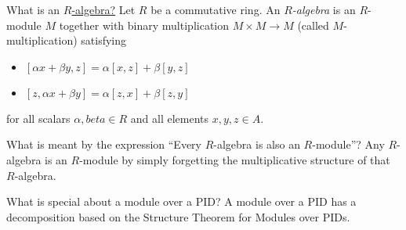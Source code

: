 \documentclass[avery5371,grid]{flashcards}
\begin{document}
\begin{flashcard}[Modules]{What is an \underline{$R$-algebra?}}
 Let $R$ be a commutative ring. An \emph{$R$-algebra} is an $R$-module $M$ together with binary multiplication $M \times M \to M$ (called $M$-multiplication) satisfying
 \begin{itemize}
      \item $[\alpha x + \beta y, z] = \alpha[x,z] + \beta[y,z]$
      \item $[z, \alpha x + \beta y] = \alpha[z,x] + \beta[z,y]$
 \end{itemize}
for all scalars $\alpha, beta \in R$ and all elements $x,y,z \in A$.
\end{flashcard}


\begin{flashcard}[Modules]{What is meant by the expression ``Every $R$-algebra is also an $R$-module''?}
 Any $R$-algebra is an $R$-module by simply forgetting the multiplicative structure of that $R$-algebra.
\end{flashcard}

\begin{flashcard}[Modules]{What is special about a module over a PID?}
 A module over a PID has a decomposition based on the Structure Theorem for Modules over PIDs.
\end{flashcard}
\end{document}
